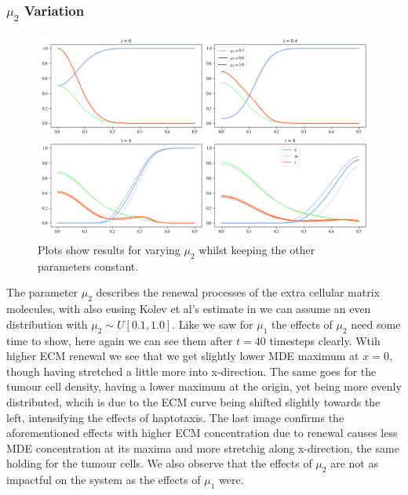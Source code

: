 \subsubsection*{$\mu_2$ Variation}
\begin{figure}[h]
    \centering
    \includegraphics[width=\textwidth]{resources/images/prolif_mu_2_variation.png}
    \caption{Plots show results for varying $\mu_2$ whilst keeping the other parameters constant.}
    \label{fig:prolif_mu_2_variation}
\end{figure}

The parameter $\mu_2$ describes the renewal processes of the extra cellular matrix molecules, with also eusing Kolev et al's estimate in \cite{Kolev2010} we can assume an even distribution with $\mu_2 \sim U[0.1, 1.0]$.\newline 
Like we saw for $\mu_1$ the effects of $\mu_2$ need some time to show, here again we can see them after $t=40$ timesteps clearly. Wtih higher ECM renewal we see that we get slightly lower MDE maximum at $x=0$, though having stretched a little more into x-direction. The same goes for the tumour cell density, having a lower maximum at the origin, yet being more evenly distributed, whcih is due to the ECM curve being shifted slightly towards the left, intensifying the effects of haptotaxis. The last image confirms the aforementioned effects with higher ECM concentration due to renewal causes less MDE concentration at its maxima and more stretchig along x-direction, the same holding for the tumour cells. We also observe that the effects of $\mu_2$ are not as impactful on the system as the effects of $\mu_1$ were.

